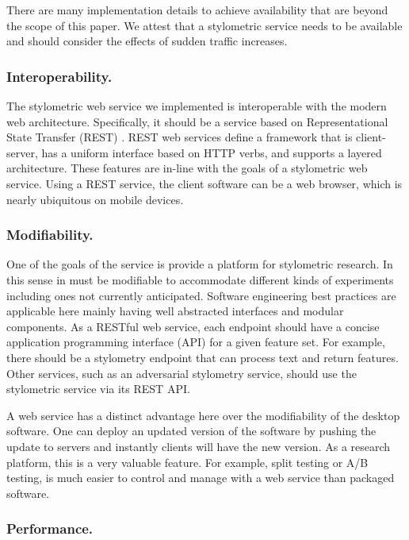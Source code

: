\documentclass[letterpaper]{article}
\begin{document}
There are many implementation details to achieve availability that are
beyond the scope of this paper.  We attest that a stylometric service
needs to be available and should consider the effects of sudden
traffic increases.

\subsubsection{Interoperability.}

The stylometric web service we implemented is interoperable with the modern
web architecture.  Specifically, it should be a service based on
Representational State Transfer (REST) \cite{Fielding2000}.  REST web
services define a framework that is client-server, has a uniform
interface based on HTTP verbs, and supports a layered architecture.
These features are in-line with the goals of a stylometric web
service.  Using a REST service, the client software can be a web
browser, which is nearly ubiquitous on mobile devices.

\subsubsection{Modifiability.}

One of the goals of the service is provide a platform for stylometric
research.  In this sense in must be modifiable to accommodate different
kinds of experiments including ones not currently anticipated.
Software engineering best practices are applicable here mainly having
well abstracted interfaces and modular components.  As a RESTful web
service, each endpoint should have a concise application programming
interface (API) for a given feature set.  For example, there should be
a stylometry endpoint that can process text and return features.
Other services, such as an adversarial stylometry service, should use
the stylometric service via its REST API.

A web service has a distinct advantage here over the modifiability of
the desktop software.  One can deploy an updated version of the
software by pushing the update to servers and instantly clients will
have the new version.  As a research platform, this is a very valuable
feature.  For example, split testing or A/B testing, is much easier to
control and manage with a web service than packaged software.

\subsubsection{Performance.}
\end{document}
